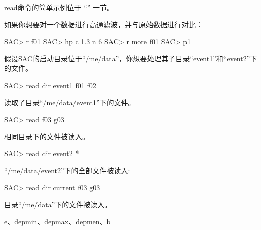 read命令的简单示例位于 ``'' 一节。

如果你想要对一个数据进行高通滤波，并与原始数据进行对比：
\begin{SACCode}
SAC> r f01
SAC> hp c 1.3 n 6
SAC> r more f01
SAC> p1
\end{SACCode}

假设SAC的启动目录位于``/me/data''，你想要处理其子目录``event1''和``event2''下的文件。
\begin{SACCode}
SAC> read dir event1 f01 f02
\end{SACCode}
读取了目录``/me/data/event1''下的文件。

\begin{SACCode}
SAC> read f03 g03
\end{SACCode}
相同目录下的文件被读入。

\begin{SACCode}
SAC> read dir event2 *
\end{SACCode}
``/me/data/event2''下的全部文件被读入:

\begin{SACCode}
SAC> read dir current f03 g03
\end{SACCode}
目录``/me/data''下的文件被读入。

e、depmin、depmax、depmen、b
